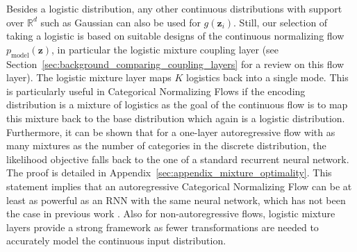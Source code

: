 Besides a logistic distribution, any other continuous distributions with support over $\mathbb{R}^{d}$ such as Gaussian can also be used for $g(\bm{z}_i)$.
Still, our selection of taking a logistic is based on suitable designs of the continuous normalizing flow $p_{\text{model}}(\bm{z})$, in particular the logistic mixture coupling layer \cite{Flow++} (see Section~\ref{sec:background_comparing_coupling_layers} for a review on this flow layer). 
The logistic mixture layer maps $K$ logistics back into a single mode.
This is particularly useful in Categorical Normalizing Flows if the encoding distribution is a mixture of logistics as the goal of the continuous flow is to map this mixture back to the base distribution which again is a logistic distribution.
Furthermore, it can be shown that for a one-layer autoregressive flow with as many mixtures as the number of categories in the discrete distribution, the likelihood objective falls back to the one of a standard recurrent neural network. 
The proof is detailed in Appendix~\ref{sec:appendix_mixture_optimality}.
This statement implies that an autoregressive Categorical Normalizing Flow can be at least as powerful as an RNN with the same neural network, which has not been the case in previous work \cite{SemiDiscreteNFSequence}.  
Also for non-autoregressive flows, logistic mixture layers provide a strong framework as fewer transformations are needed to accurately model the continuous input distribution. 

